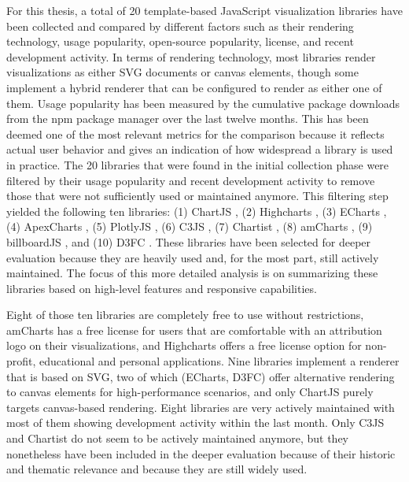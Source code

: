For this thesis, a total of 20 template-based JavaScript visualization libraries have been collected and compared by different factors such as their rendering technology, usage popularity, open-source popularity, license, and recent development activity. 
In terms of rendering technology, most libraries render visualizations as either SVG documents or canvas elements, though some implement a hybrid renderer that can be configured to render as either one of them. 
Usage popularity has been measured by the cumulative package downloads from the npm package manager over the last twelve months. 
This has been deemed one of the most relevant metrics for the comparison because it reflects actual user behavior and gives an indication of how widespread a library is used in practice. 
The 20 libraries that were found in the initial collection phase were filtered by their usage popularity and recent development activity to remove those that were not sufficiently used or maintained anymore. 
This filtering step yielded the following ten libraries: (1) ChartJS \parencite{ChartJS}, (2) Highcharts \parencite{Highcharts}, (3) ECharts \parencite{ECharts}, (4) ApexCharts \parencite{ApexCharts}, (5) PlotlyJS \parencite{PlotlyJS}, (6) C3JS \parencite{C3JS}, (7) Chartist \parencite{Chartist}, (8) amCharts \parencite{amCharts}, (9) billboardJS \parencite{billboardJS}, and (10) D3FC \parencite{D3FC}. 
These libraries have been selected for deeper evaluation because they are heavily used and, for the most part, still actively maintained. 
The focus of this more detailed analysis is on summarizing these libraries based on high-level features and responsive capabilities.

Eight of those ten libraries are completely free to use without restrictions, amCharts has a free license for users that are comfortable with an attribution logo on their visualizations, and Highcharts offers a free license option for non-profit, educational and personal applications.
Nine libraries implement a renderer that is based on SVG, two of which (ECharts, D3FC) offer alternative rendering to canvas elements for high-performance scenarios, and only ChartJS purely targets canvas-based rendering. 
Eight libraries are very actively maintained with most of them showing development activity within the last month. 
Only C3JS and Chartist do not seem to be actively maintained anymore, but they nonetheless have been included in the deeper evaluation because of their historic and thematic relevance and because they are still widely used. 

